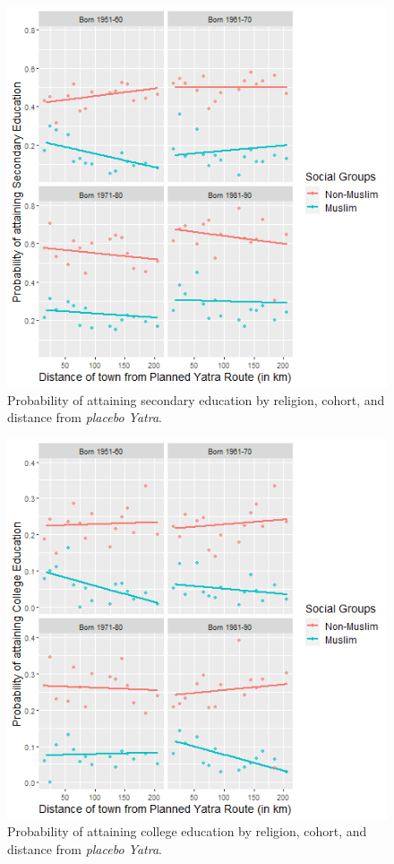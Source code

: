 \documentclass{article}
\begin{document}
\begin{figure}[H]
    \centering
    \includegraphics[scale = 0.7]{images/graph_li_sec_mus_p.png}
    \caption{Probability of attaining secondary education by religion, cohort, and distance from \textit{placebo Yatra}.}
    \label{fig:li_sec_mus_p}
\end{figure}

\begin{figure}[H]
    \centering
    \includegraphics[scale = 0.7]{images/graph_li_col_mus_p.png}
    \caption{Probability of attaining college education by religion, cohort, and distance from \textit{placebo Yatra}.}
    \label{fig:li_col_mus_p}
\end{figure}
\end{document}
